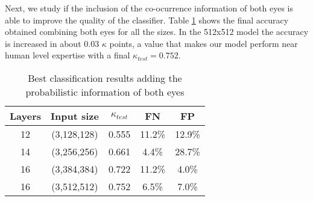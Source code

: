Next, we study if the inclusion of the co-ocurrence information of both eyes is able to improve the quality of the classifier. Table \ref{table-results2} shows the final accuracy obtained combining both eyes for all the sizes. In the 512x512 model the accuracy is increased in about $0.03$ $\kappa$ points, a value that makes our model perform near human level expertise with a final $\kappa_{test} = 0.752$.

\begin{table}[ht!]
	\centering
	\begin{tabular}{c c c c c} 
		\hline
		Layers & Input size & $\kappa_{test}$ & FN & FP \\ [0.5ex] 
		\hline\hline
		12 & (3,128,128) & 0.555 & 11.2\%& 12.9\%\\ 
		14 & (3,256,256) & 0.661 & 4.4\% & 28.7\% \\ 
		16 & (3,384,384) & 0.722 & 11.2\% & 4.0\%  \\ 
		16 & (3,512,512) & 0.752 & 6.5\% & 7.0\% \\ 
		\hline
	\end{tabular}
	\caption{Best classification results adding the probabilistic information of both eyes}
	\label{table-results2}
\end{table}

